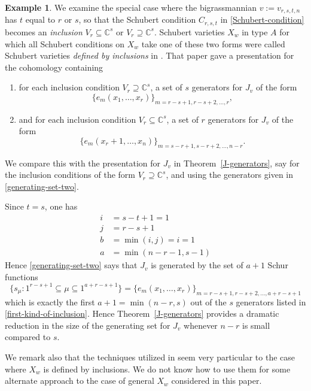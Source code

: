 \documentclass[12pt,dvips]{amsart}
\theoremstyle{plain}
\theoremstyle{definition}
\newtheorem{example}[theorem]{Example}
\theoremstyle{remark}
\numberwithin{equation}{section}
\def\CC{{\mathbb C}}
\begin{document}
\begin{example}
\label{GR-comparison}
We examine the special case where the bigrassmannian 
$v:=v_{r,s,t,n}$ has $t$ equal to $r$ or $s$, so that the Schubert condition $C_{r,s,t}$
in \ref{Schubert-condition} becomes an {\it inclusion} 
$V_r \subseteq \CC^s$ or $V_r \supseteq \CC^s$.
Schubert varieties $X_w$ in type $A$ for which 
all Schubert conditions on $X_w$ take one of these two forms
were called Schubert varieties {\it defined by inclusions} in
\cite{GasharovReiner}.  That paper gave a presentation for the cohomology
containing
\begin{enumerate}
\item[$\bullet$]
for each inclusion condition $V_r \supseteq \CC^s$, 
a set of $s$ generators for $J_v$ of the form 
\begin{equation}
\label{first-kind-of-inclusion}
\{ e_m(x_1,\ldots,x_r) \}_{m=r-s+1,r-s+2,\ldots,r},
\end{equation}
\item[$\bullet$]
and for each inclusion condition $V_r \subseteq \CC^s$, 
a set of $r$ generators for $J_v$ of the form 
\begin{equation}
\{ e_m(x_r+1,\ldots,x_n) \}_{m=s-r+1,s-r+2,\ldots,n-r}.
\end{equation}
\end{enumerate}
We compare this with the presentation for $J_v$ 
in Theorem~\ref{J-generators},
say for the inclusion conditions of the form 
$V_r \supseteq \CC^s$, and using the 
generators given in \eqref{generating-set-two}.

Since $t=s$, one has 
$$
\begin{aligned}
i&=s-t+1=1\\
j&=r-s+1\\
b&=\min(i,j)=i=1\\
a&=\min(n-r-1,s-1)
\end{aligned}
$$
Hence  \eqref{generating-set-two} says
that $J_v$ is generated by the set of $a+1$ Schur functions 
$$
\{ s_\mu: 1^{r-s+1} \subseteq \mu \subseteq 1^{a+r-s+1} \}
=\{ e_m(x_1,\ldots,x_r) \}_{m=r-s+1,r-s+2,\ldots,a+r-s+1}
$$
which is exactly the first $a+1=\min(n-r,s)$ out of the $s$ generators 
listed in \eqref{first-kind-of-inclusion}.  Hence Theorem~\ref{J-generators}
provides a dramatic reduction in the size of the 
generating set for $J_v$ whenever $n-r$ is small compared to $s$.

We remark also that the techniques utilized in \cite{GasharovReiner}
seem very particular to the case where $X_w$ is defined by inclusions.
We do not know how to use them for some alternate approach
to the case of general $X_w$ considered in this paper.
\end{example}
\end{document}

